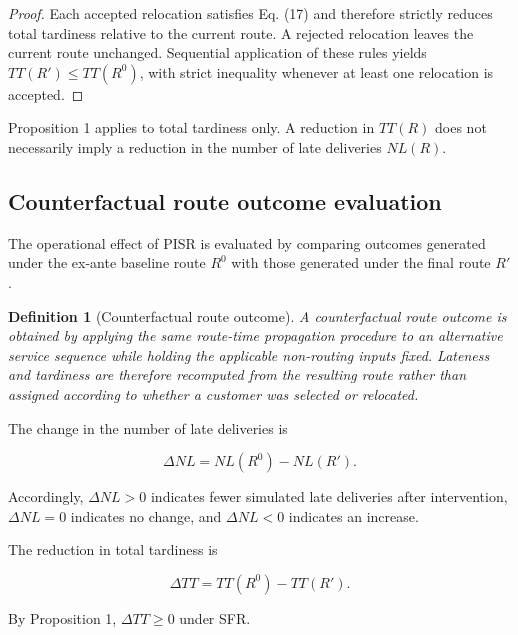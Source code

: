 \documentclass[11pt,a4paper]{article}
\newtheorem{definition}{Definition}
\begin{document}
\begin{proof} Each accepted relocation satisfies Eq. (17) and
therefore strictly reduces total tardiness relative to the current
route. A rejected relocation leaves the current route unchanged.
Sequential application of these rules yields
\(TT\left( R' \right) \leq TT\left( R^{0} \right)\), with strict
inequality whenever at least one relocation is accepted.
\end{proof}

Proposition 1 applies to total tardiness only. A reduction in \(TT(R)\)
does not necessarily imply a reduction in the number of late deliveries
\(NL(R)\).

\subsection{Counterfactual route outcome evaluation}\label{sec:counterfactual-evaluation}

The operational effect of PISR is evaluated by comparing outcomes
generated under the ex-ante baseline route \(R^{0}\) with those
generated under the final route \(R'\).

\begin{definition}[Counterfactual route outcome]
A counterfactual route outcome is obtained by applying the same route-time propagation procedure to an alternative service sequence while holding the applicable non-routing inputs fixed. Lateness and tardiness are therefore recomputed from the resulting route rather than assigned according to whether a customer was selected or relocated.
\end{definition}

The change in the number of late deliveries is

\begin{equation}
\Delta NL = NL\left( R^{0} \right) - NL\left( R' \right).
\label{eq:19}
\end{equation}

Accordingly, \(\Delta NL > 0\) indicates fewer simulated late deliveries
after intervention, \(\Delta NL = 0\) indicates no change, and
\(\Delta NL < 0\) indicates an increase.

The reduction in total tardiness is

\begin{equation}
\Delta TT = TT\left( R^{0} \right) - TT\left( R' \right).
\label{eq:20}
\end{equation}

By Proposition 1, \(\Delta TT \geq 0\) under SFR.
\end{document}
